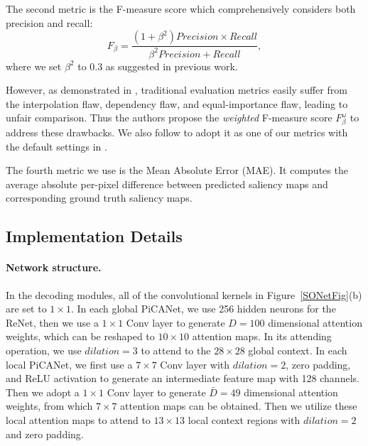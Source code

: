 \documentclass[10pt,twocolumn,letterpaper]{article}
\begin{document}
The second metric is the F-measure score which comprehensively considers both precision and recall:
\begin{equation} \label{fmeasure}
F_{\beta}=\frac{(1+\beta^2)Precision\times Recall}{\beta^2 Precision+Recall},
\end{equation}
where we set $\beta^2$ to 0.3 as suggested in previous work.

However, as demonstrated in \cite{margolin2014evaluate}, traditional evaluation metrics easily suffer from the interpolation flaw, dependency flaw, and equal-importance flaw, leading to unfair comparison. Thus the authors propose the \emph{weighted} F-measure score $F_{\beta}^{\omega}$ to address these drawbacks. We also follow \cite{gong2015saliency,tu2016real,hu2017dls} to adopt it as one of our metrics with the default settings in \cite{margolin2014evaluate}.

The fourth metric we use is the Mean Absolute Error (MAE). It computes the average absolute per-pixel difference between predicted saliency maps and corresponding ground truth saliency maps.
\subsection{Implementation Details}

\paragraph{Network structure.}
In the decoding modules, all of the convolutional kernels in Figure~\ref{SONetFig}(b) are set to $1\times 1$. In each global PiCANet, we use 256 hidden neurons for the ReNet, then we use a $1\times 1$ Conv layer to generate $D=100$ dimensional attention weights, which can be reshaped to $10\times 10$ attention maps. In its attending operation, we use $dilation=3$ to attend to the $28\times 28$ global context. In each local PiCANet, we first use a $7\times 7$ Conv layer with $dilation=2$, zero padding, and ReLU activation to generate an intermediate feature map with 128 channels. Then we adopt a $1\times 1$ Conv layer to generate $\bar{D}=49$ dimensional attention weights, from which $7\times 7$ attention maps can be obtained. Then we utilize these local attention maps to attend to $13\times 13$ local context regions with $dilation=2$ and zero padding.
\end{document}
